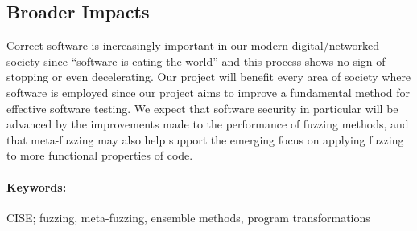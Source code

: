 \subsection*{Broader Impacts}
\vspace{-2mm}

Correct software is increasingly important in our modern digital/networked 
society since ``software is eating the world'' and this process shows no sign 
of stopping or even decelerating. 
Our project will benefit every area of society where software is employed since 
our project aims to improve a fundamental method for effective software testing.
We expect that software security in particular will be advanced by the 
improvements made to the performance of fuzzing methods, and that meta-fuzzing 
may also help support the emerging focus on applying fuzzing to more functional 
properties of code.

\paragraph{Keywords:}
CISE; fuzzing, meta-fuzzing, ensemble methods, program transformations
